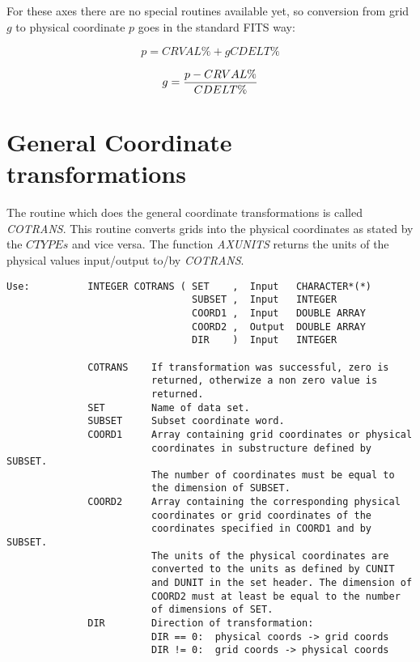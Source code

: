 \noindent For these axes there are no special routines available yet, so
conversion from grid $g$ to physical coordinate $p$ goes in the standard
FITS way:

$$p = CRVAL\% + gCDELT\%$$

$$g = {p - CRVAL\%\over{CDELT\%}}$$

\section{General Coordinate transformations}

The routine which does the general coordinate transformations is called
{\sl COTRANS\/}.  This routine converts grids into
the physical coordinates as stated by the $CTYPEs$ and vice versa.  The
function {\sl AXUNITS\/} returns the units of the
physical values input/output to/by {\sl COTRANS\/}. 

\begin{verbatim}
Use:          INTEGER COTRANS ( SET    ,  Input   CHARACTER*(*)
                                SUBSET ,  Input   INTEGER
                                COORD1 ,  Input   DOUBLE ARRAY
                                COORD2 ,  Output  DOUBLE ARRAY
                                DIR    )  Input   INTEGER

              COTRANS    If transformation was successful, zero is
                         returned, otherwize a non zero value is
                         returned.
              SET        Name of data set.
              SUBSET     Subset coordinate word.
              COORD1     Array containing grid coordinates or physical
                         coordinates in substructure defined by SUBSET.
                         The number of coordinates must be equal to
                         the dimension of SUBSET.
              COORD2     Array containing the corresponding physical
                         coordinates or grid coordinates of the
                         coordinates specified in COORD1 and by SUBSET.
                         The units of the physical coordinates are
                         converted to the units as defined by CUNIT
                         and DUNIT in the set header. The dimension of
                         COORD2 must at least be equal to the number
                         of dimensions of SET.
              DIR        Direction of transformation:
                         DIR == 0:  physical coords -> grid coords
                         DIR != 0:  grid coords -> physical coords
\end{verbatim}

